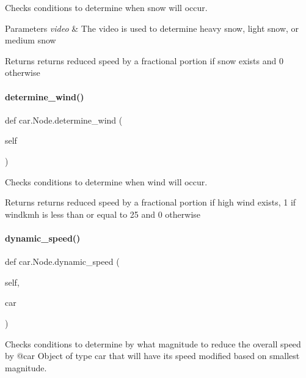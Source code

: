 Checks conditions to determine when snow will occur. 


\begin{DoxyParams}{Parameters}
{\em video} & The video is used to determine heavy snow, light snow, or medium snow \\
\hline
\end{DoxyParams}
\begin{DoxyReturn}{Returns}
returns reduced speed by a fractional portion if snow exists and 0 otherwise 
\end{DoxyReturn}
\mbox{\label{classcar_1_1_node_ad7c3d784fff597ed642f546a0bb38398}} 
\paragraph{\texorpdfstring{determine\_wind()}{determine\_wind()}}
{\footnotesize\ttfamily def car.\+Node.\+determine\+\_\+wind (\begin{DoxyParamCaption}\item[{}]{self }\end{DoxyParamCaption})}



Checks conditions to determine when wind will occur. 

\begin{DoxyReturn}{Returns}
returns reduced speed by a fractional portion if high wind exists, 1 if windkmh is less than or equal to 25 and 0 otherwise 
\end{DoxyReturn}
\mbox{\label{classcar_1_1_node_a4245124715ae3b57e766b7bae55ecbf7}} 
\paragraph{\texorpdfstring{dynamic\_speed()}{dynamic\_speed()}}
{\footnotesize\ttfamily def car.\+Node.\+dynamic\+\_\+speed (\begin{DoxyParamCaption}\item[{}]{self,  }\item[{}]{car }\end{DoxyParamCaption})}



Checks conditions to determine by what magnitude to reduce the overall speed by @car Object of type car that will have its speed modified based on smallest magnitude. 

